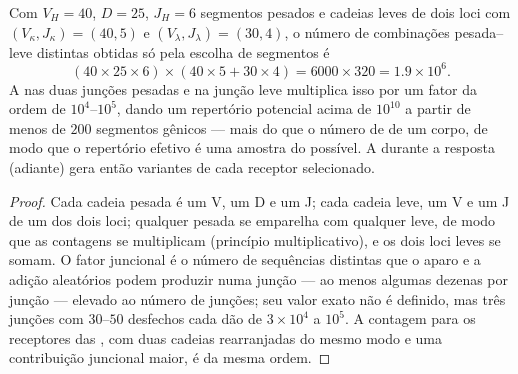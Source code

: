 \begin{theorem}\label{thm:b3:adaptive-immunity:repertoire}
Com $V_{H} = 40$, $D = 25$, $J_{H} = 6$ segmentos pesados e cadeias
leves de dois loci com $(V_{\kappa}, J_{\kappa}) = (40, 5)$ e
$(V_{\lambda}, J_{\lambda}) = (30, 4)$, o número de combinações
pesada--leve distintas obtidas só pela escolha de segmentos é
\[
(40\times 25\times 6)\times(40\times 5 + 30\times 4) = 6000\times 320
= 1.9\times 10^{6}.
\]
A  nas duas junções pesadas e na junção leve
multiplica isso por um fator da ordem de $10^{4}$--$10^{5}$, dando um
repertório potencial acima de $10^{10}$ a partir de menos de $200$
segmentos gênicos --- mais do que o número de  de um corpo, de
modo que o repertório efetivo é uma amostra do possível. A  durante a resposta (adiante) gera então variantes de cada
receptor selecionado.
\end{theorem}
\begin{proof}
Cada cadeia pesada é um V, um D e um J; cada cadeia leve, um V e um J de
um dos dois loci; qualquer pesada se emparelha com qualquer leve, de
modo que as contagens se multiplicam (princípio multiplicativo), e os
dois loci leves se somam. O fator juncional é o número de sequências
distintas que o aparo e a adição aleatórios podem produzir numa junção
--- ao menos algumas dezenas por junção --- elevado ao número de
junções; seu valor exato não é definido, mas três junções com $30$--$50$
desfechos cada dão de $3\times 10^{4}$ a $10^{5}$. A contagem para os
receptores das , com duas cadeias rearranjadas do mesmo modo e
uma contribuição juncional maior, é da mesma ordem.
\end{proof}

